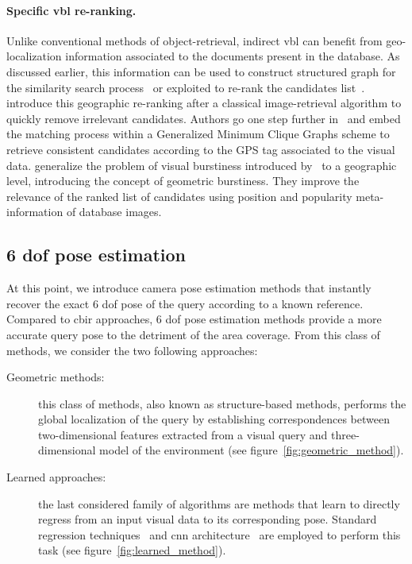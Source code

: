 \paragraph{Specific \ac{vbl} re-ranking.}
Unlike conventional methods of object-retrieval, indirect \ac{vbl} can benefit from geo-localization information associated to the documents present in the database. As discussed earlier, this information can be used to construct structured graph for the similarity search process~\citep{Torii2011,Cao2013} or exploited to re-rank the candidates list~\citep{Zamir2010,Zamir2014,Sattler2016}. \citet{Zamir2010} introduce this geographic re-ranking after a classical image-retrieval algorithm to quickly remove irrelevant candidates. Authors go one step further in~\citep{Zamir2014} and embed the matching process within a Generalized Minimum Clique Graphs scheme to retrieve consistent candidates according to the GPS tag associated to the visual data. \citet{Sattler2016} generalize the problem of visual burstiness introduced by~\citep{Jegou2009} to a geographic level, introducing the concept of geometric burstiness. They improve the relevance of the ranked list of candidates using position and popularity meta-information of database images.

\subsection{6 \acs*{dof} pose estimation}
\label{subsec:fine_pose_estimation}

At this point, we introduce camera pose estimation methods that instantly recover the exact 6 \ac{dof} pose of the query according to a known reference. Compared to \ac{cbir} approaches, 6 \ac{dof} pose estimation methods provide a more accurate query pose to the detriment of the area coverage. From this class of methods, we consider the two following approaches:
\begin{description}
	\item[Geometric methods:] this class of methods, also known as structure-based methods, performs the global localization of the query by establishing correspondences between two-dimensional features extracted from a visual query and three-dimensional model of the environment (see figure~\ref{fig:geometric_method}).
	\item[Learned approaches:] the last considered family of algorithms are methods that learn to directly regress from an input visual data to its corresponding pose. Standard regression techniques~\citep{Shotton2013} and \ac{cnn} architecture~\citep{Kendall2015} are employed to perform this task (see figure~\ref{fig:learned_method}).
\end{description}



